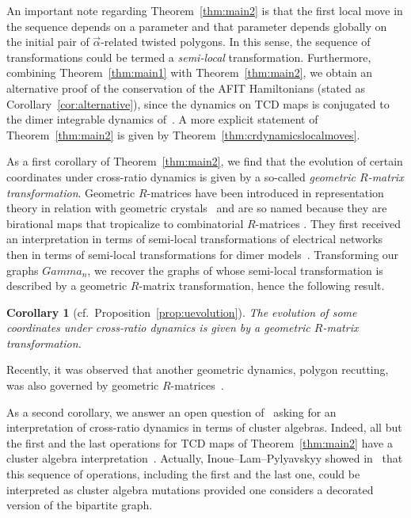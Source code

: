 \documentclass[10pt,a4paper]{amsart}
\numberwithin{equation}{section}
\newtheorem{Corollary}[Theorem]{Corollary}
\def\Gamma{Gamma}
\begin{document}
	An important note regarding Theorem~\ref{thm:main2} is that the first local move in the sequence depends on a parameter and that parameter depends globally on the initial pair of $\vec{\alpha}$-related twisted polygons. {In this sense, the sequence of transformations could be termed a \emph{semi-local} transformation.} Furthermore, combining Theorem~\ref{thm:main1} with Theorem~\ref{thm:main2}, we obtain an alternative proof of the conservation of the AFIT Hamiltonians (stated as Corollary~\ref{cor:alternative}), since the dynamics on TCD maps is conjugated to the dimer integrable dynamics of~\cite{GK13}. A more explicit statement of Theorem~\ref{thm:main2} is given by Theorem~\ref{thm:crdynamicslocalmoves}.
	
	As a first corollary of Theorem~\ref{thm:main2}, we find that the evolution of certain coordinates under cross-ratio dynamics is given by a so-called \emph{geometric $R$-matrix transformation}. Geometric $R$-matrices have been introduced in representation theory in relation with geometric crystals~\mbox{\cite{BK,Etingof,KNY,KNO}} and are so named because they are birational maps that tropicalize to combinatorial $R$-matrices \cite{MR1187560}. They first received an interpretation in terms of semi-local transformations of electrical networks~\cite{LP3, LP1,LP2} then in terms of semi-local transformations for dimer models~\mbox{\cite{Chepuri,GeRa, ILP1,ILP2}}. Transforming our graphs $\Gamma_n$, we recover the graphs of \cite{ILP1} whose semi-local transformation is described by a geometric $R$-matrix transformation, hence the following result.
	
	\begin{Corollary}[cf.\ Proposition~\ref{prop:uevolution}]
		\label{cor:rmatrix}
		The evolution of some coordinates under cross-ratio dynamics is given by a geometric $R$-matrix transformation.
	\end{Corollary}
	
	Recently, it was observed that another geometric dynamics, polygon recutting, was also governed by geometric $R$-matrices~\cite{Izosimov2}.
	
	As a second corollary, we answer an open question of~\cite{AFIT} asking for an interpretation of cross-ratio dynamics in terms of cluster algebras. Indeed, all but the first and the last operations for TCD maps of Theorem~\ref{thm:main2} have a cluster algebra interpretation~\cite{AGPR,AGR}. Actually, Inoue--Lam--Pylyavskyy showed in~\cite{ILP2} that this sequence of operations, including the first and the last one, could be interpreted as cluster algebra mutations provided one considers a decorated version of the bipartite graph.
	
\end{document}
